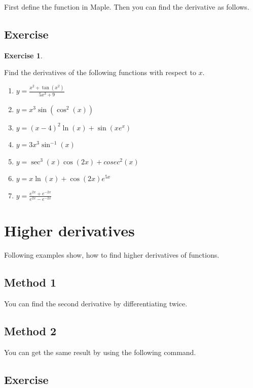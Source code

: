 \documentclass[
]{book}
\providecommand{\tightlist}{%
  \setlength{\itemsep}{0pt}\setlength{\parskip}{0pt}}
\theoremstyle{definition}
\theoremstyle{definition}
\theoremstyle{definition}
\newtheorem{exercise}{Exercise}[chapter]
\theoremstyle{definition}
\theoremstyle{remark}
\begin{document}
First define the function in Maple. Then you can find the derivative as follows.

\subsection{Exercise}\label{exercise-6}

\begin{exercise}
\protect\hypertarget{exr:unnamed-chunk-36}{}\label{exr:unnamed-chunk-36}

Find the derivatives of the following functions with respect to \(x\).

\begin{enumerate}
\def\labelenumi{\arabic{enumi}.}
\tightlist
\item
  \(y = \frac{x^2 + \tan(x^2)}{5x^3 + 9}\)
\item
  \(y = x^{3}\sin(\cos^2(x))\)
\item
  \(y = {(x - 4)^2}{\ln(x)} + \sin(xe^x)\)
\item
  \(y = {3x^3}{\sin^{-1}(x)}\)
\item
  \(y = {\sec^3(x)\cos(2x) + cosec^2(x)}\)
\item
  \(y = x\ln(x) + \cos(2x)e^{5x}\)
\item
  \(y = \frac{e^{2x} + e^{-2x}}{e^{2x} - e^{-2x}}\)
\end{enumerate}

\end{exercise}

\section{Higher derivatives}\label{higher-derivatives}

Following examples show, how to find higher derivatives of functions.

\subsection{Method 1}\label{method-1}

You can find the second derivative by differentiating twice.

\subsection{Method 2}\label{method-2}

You can get the same result by using the following command.

\subsection{Exercise}\label{exercise-7}
\end{document}
